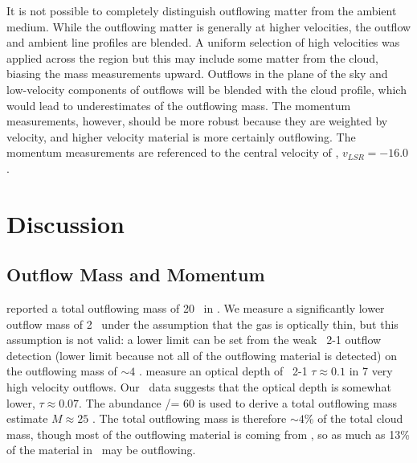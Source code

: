 It is not possible to completely distinguish outflowing matter from the ambient
medium.  While the outflowing matter is generally at higher velocities, the
outflow and ambient line profiles are blended.  A uniform selection of high
velocities was applied across the region but this may include some matter from
the cloud, biasing the mass measurements upward.  Outflows in the plane of the
sky and low-velocity components of outflows will be blended with the cloud
profile, which would lead to underestimates of the outflowing mass.  The
momentum measurements, however, should be more robust because they are weighted
by velocity, and higher velocity material is more certainly outflowing.  The
momentum measurements are referenced to the central velocity of \necluster,
$v_{LSR}=-16.0$ \kms.



\section{Discussion}

\subsection{Outflow Mass and Momentum}
\label{sec:discussion-outflows}
\citet{beuther2002} reported a total outflowing mass of 20 \msun\ in \necluster.  We
measure a significantly lower outflow mass of 2 \msun\ under the assumption
that the gas is optically thin, but this assumption is not valid: a lower limit
can be set from the weak \thirteenco\ 2-1 outflow detection  (lower limit
because not all of the outflowing material is detected) on the outflowing mass
of $\sim 4$ \msun .  \citet{choi1993} measure an optical depth of  \thirteenco\
2-1 $\tau \approx 0.1$ in 7 very high velocity outflows.  
Our \thirteenco\ data suggests that the optical depth is somewhat lower,
 $\tau\approx0.07$. The abundance \twelveco/\thirteenco = 60 is used  \citep{lucas1998}  
to derive a total outflowing mass estimate $M\approx25$ \msun .  The total outflowing mass is
therefore $\sim 4\%$ of the total cloud mass, though most
of the outflowing material is coming from \necluster, so as much as 13\% of the
material in \necluster\ may be outflowing.

